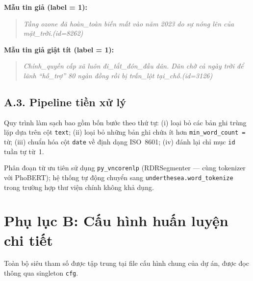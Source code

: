 \noindent\textbf{Mẫu tin giả (label = 1):}
\begin{quote}\small\itshape
Tầng ozone đã hoàn\_toàn biến mất vào năm 2023 do sự nóng lên
của mặt\_trời.\hfill(id=8262)
\end{quote}

\noindent\textbf{Mẫu tin giả giật tít (label = 1):}
\begin{quote}\small\itshape
Chính\_quyền cấp xã luôn đi\_tắt\_đón\_đầu dân. Dân chờ cả ngày
trời để lãnh ``hỗ\_trợ'' 80 ngàn đồng rồi bị trấn\_lột tại\_chỗ.\hfill(id=3126)
\end{quote}

\subsection*{A.3. Pipeline tiền xử lý}

Quy trình làm sạch bao gồm bốn bước theo thứ tự: (i) loại bỏ các bản ghi trùng lặp dựa trên cột \texttt{text}; (ii) loại bỏ những bản ghi chứa ít hơn \texttt{min\_word\_count = \minwordcount{}} từ; (iii) chuẩn hóa cột \texttt{date} về định dạng ISO~8601; (iv) đánh lại chỉ mục \texttt{id} tuần tự từ~1.

Phân đoạn từ ưu tiên sử dụng \texttt{py\_vncorenlp} (RDRSegmenter --- cùng tokenizer với PhoBERT); hệ thống tự động chuyển sang \texttt{underthesea.word\_tokenize} trong trường hợp thư viện chính không khả dụng.

\section*{Phụ lục B: Cấu hình huấn luyện chi tiết}

Toàn bộ siêu tham số được tập trung tại file cấu hình chung của dự án, được đọc thông qua singleton \texttt{cfg}.

